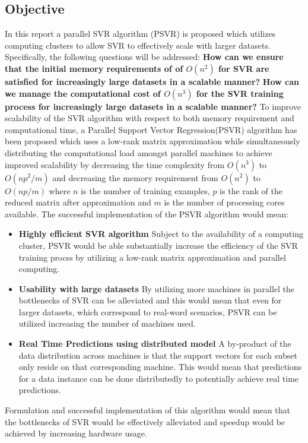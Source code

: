 \documentclass[12pt]{article}
\begin{document}
\subsection{Objective}
In this report a parallel SVR algorithm (PSVR) is proposed which utilizes computing clusters to allow SVR to effectively scale with larger datasets.
Specifically, the following questions will be addressed:
\newline\newline
\setlength{\leftskip}{3cm}
{\bf How can we ensure that the initial memory requirements of of $O(n^2)$ for SVR are satisfied for increasingly large datasets in a scalable manner?}
\newline\newline
{\bf How can we manage the computational cost of $O(n^3)$ for the SVR training process for increasingly large datasets in a scalable manner?}
\setlength{\leftskip}{0pt}
\newline\newline
To improve scalability of the SVR algorithm with respect to both memory requirement and computational time, a Parallel Support Vector Regression(PSVR) algorithm has been proposed which uses a low-rank matrix approximation while simultaneously distributing the computational load amongst parallel machines to achieve improved scalability by decreasing the time complexity from $O(n^3)$ to $O(np^2/m)$ and decreasing the memory requirement from $O(n^2)$ to $O(np/m)$ where $n$ is the number of training examples, $p$ is the rank of the reduced matrix after approximation and $m$ is the number of processing cores available.
\newline\newline
The successful implementation of the PSVR algorithm would mean:
\begin{itemize}
\item {\bf Highly efficient SVR algorithm} 
Subject to the availability of a computing cluster, PSVR would be able substantially increase the efficiency of the SVR training procss by utilizing a low-rank matrix approximation and parallel computing.
\item {\bf Usability with large datasets} By utilizing more machines in parallel the bottlenecks of SVR can be alleviated and this would mean that even for larger datasets, which correspond to real-word scenarios, PSVR can be utilized increasing the number of machines used.
\item {\bf Real Time Predictions using distributed model} A by-product of the data distribution across machines is that the support vectors for each subset only reside on that corresponding machine. This would mean that predictions for a data instance can be done distributedly to potentially achieve real time predictions.
\end{itemize}
Formulation and successful implementation of this algorithm would mean that the bottlenecks of SVR would be effectively alleviated and speedup would be achieved by increasing hardware usage.
\end{document}
